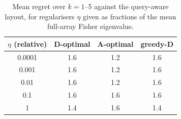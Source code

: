\begin{table}[h]\centering\footnotesize
\caption{Mean \REPORT{} regret over $k=1$--5 against the query-aware layout, for regularisers $\eta$ given as fractions of the mean full-array Fisher eigenvalue.}\label{tab:s16}
\begin{tabular}{cccc}\toprule $\eta$ (relative) & D-optimal & A-optimal & greedy-D\\ \midrule
0.0001 & 1.6 & 1.2 & 1.6 \\
0.001 & 1.6 & 1.2 & 1.6 \\
0.01 & 1.6 & 1.2 & 1.6 \\
0.1 & 1.6 & 1.6 & 1.6 \\
1 & 1.4 & 1.6 & 1.4 \\
\bottomrule\end{tabular}\end{table}